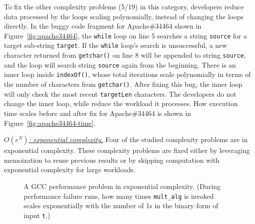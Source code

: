 To fix the other complexity problems (5/19) in this category,
developers reduce data processed by the loops scaling polynomially, 
instead of changing the loops directly.
In the buggy code fragment for Apache\#34464 shown in Figure~\ref{fig:apache34464},
the \texttt{while} loop on line 5 searches a string \texttt{source}
for a target sub-string \texttt{target}.
If the \texttt{while} loop's search is unsuccessful, 
a new character returned from \texttt{getchar()} on line 8 will be appended to string \texttt{source}, 
and the loop will search string \texttt{source} again from the beginning. 
There is an inner loop inside \texttt{indexOf()}, whose total iterations 
scale polynomially in terms of the number of characters from \texttt{getchar()}. 
After fixing this bug, the inner loop will only check the most recent \texttt{targetLen} characters.
The developers do not change the inner loop, 
while reduce the workload it processes.   
How execution time scales before and after fix for 
Apache\#34464 is shown in Figure~\ref{fig:apache34464-time}.




{\underline{\textit{$O(e^N)$: exponential complexity.}}}
Four of the studied complexity problems are in exponential complexity. 
These complexity problems are fixed 
either by leveraging memoization to reuse previous results 
or by skipping computation with exponential complexity for large workloads. 



\begin{figure}
\centering
{}
  \mbox{}
  \vspace{-0.1in}
\caption{A GCC performance problem in exponential complexity. 
 \footnotesize{(During performance failure runs, how many times \texttt{mult\_alg} is invoked scales exponentially
  with the number of 1s in the binary form of input \texttt{t}.)}}
\vspace{-0.3in}
\label{fig:gcc27733}
\vspace{-0.15in}
\end{figure}


